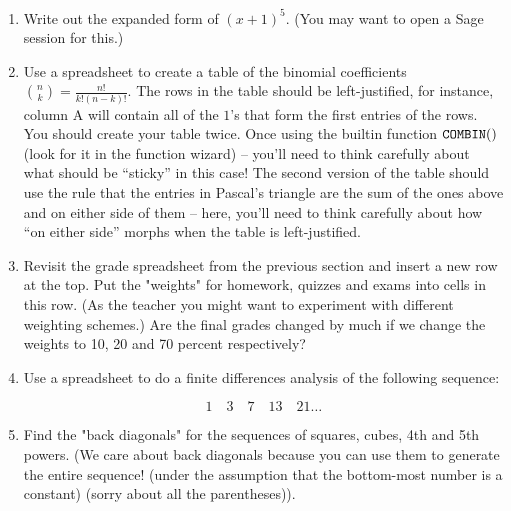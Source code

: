\begin{enumerate}

\item Write out the expanded form of $(x+1)^5$. (You may want to open a Sage session for this.)

\vspace{1in}

\item Use a spreadsheet to create a table of the binomial coefficients $\binom{n}{k} = \frac{n!}{k!(n-k)!}$.  The rows in the table should be left-justified, for instance, column A will contain all of the $1$'s that form the first entries of the rows.  You should create your table twice.  Once using the builtin function $\tt COMBIN()$ (look for it in the function wizard) -- you'll need to think carefully about what should be ``sticky'' in this case!  The second version of the table should use the rule that the entries in Pascal's triangle are the sum of the ones above and on either side of them -- here, you'll need to think carefully about how ``on either side'' morphs when the table is left-justified.
	

\vspace{1in}

\item Revisit the grade spreadsheet from the previous section and insert a new row at the top.  Put the "weights" for homework, 
quizzes and exams into cells in this row.  (As the teacher you might want to experiment with different 
weighting schemes.) Are the final grades changed by much if we change the weights to 10, 
20 and 70 percent respectively?

\vspace{1 in}

\item Use a spreadsheet to do a finite differences analysis of the following sequence:

	  \[ 1 \quad 3 \quad 7 \quad 13 \quad 21 \ldots \]

\vspace{1in}

\item Find the "back diagonals" for the sequences of squares, cubes, 4th  and 5th powers.
(We care about back diagonals because you can use them to generate the entire sequence! (under the assumption that the bottom-most number is a constant) (sorry about all the parentheses)). 

\vfill

\end{enumerate}
